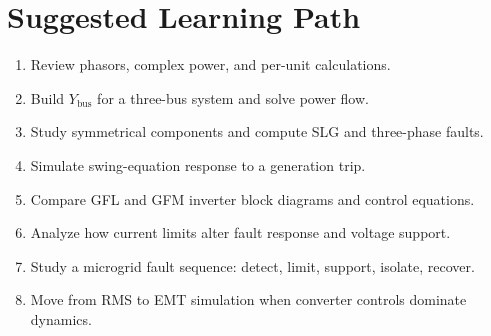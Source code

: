 \documentclass[11pt]{article}
\begin{document}
\section{Suggested Learning Path}
\begin{enumerate}
  \item Review phasors, complex power, and per-unit calculations.
  \item Build $Y_{\mathrm{bus}}$ for a three-bus system and solve power flow.
  \item Study symmetrical components and compute SLG and three-phase faults.
  \item Simulate swing-equation response to a generation trip.
  \item Compare GFL and GFM inverter block diagrams and control equations.
  \item Analyze how current limits alter fault response and voltage support.
  \item Study a microgrid fault sequence: detect, limit, support, isolate, recover.
  \item Move from RMS to EMT simulation when converter controls dominate dynamics.
\end{enumerate}
\end{document}
